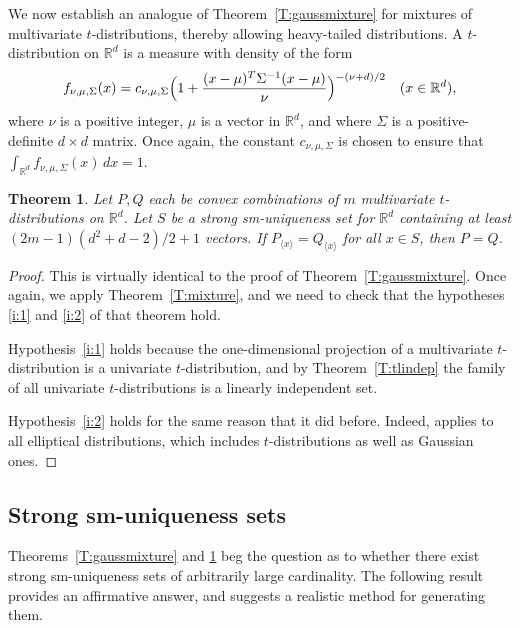 \documentclass[11pt]{amsart}
\theoremstyle{plain}
\newtheorem{theorem}{Theorem}[section]
\theoremstyle{remark}
\newcommand{\RR}{\mathbb{R}}
\begin{document}
We now establish an analogue of Theorem~\ref{T:gaussmixture}
for mixtures of  multivariate $t$-dist\-ributions,
thereby allowing heavy-tailed distributions. 
A $t$-distribution on $\RR^d$ is a measure with density of the form
\[
f_{\nu,\mu,\Sigma}(x)
=c_{\nu,\mu,\Sigma}\Bigl(1+\frac{(x-\mu)^T\Sigma^{-1}(x-\mu)}{\nu}\Bigr)^{-(\nu+d)/2}\quad(x\in\RR^d),
\]
where $\nu$ is a positive integer, $\mu$ is a vector in $\RR^d$, 
and where $\Sigma$ is a positive-definite $d\times d$ matrix.
Once again, the constant $c_{\nu,\mu,\Sigma}$ is chosen 
to ensure that $\int_{\RR^d}f_{\nu,\mu,\Sigma}(x)\,dx=1$.
	
\begin{theorem}\label{T:tmixture}
Let $P,Q$ each be convex combinations of  $m$
multivariate  $t$-dist\-ributions on $\RR^d$. 
Let $S$ be a strong sm-uniqueness set for $\RR^d$ containing at least $(2m-1)(d^2+d-2)/2+1$ vectors.
If $P_{\langle x\rangle}=Q_{\langle x\rangle}$ for all $x\in S$, then $P=Q$.
\end{theorem}
	
\begin{proof}
This is virtually identical to the proof of Theorem~\ref{T:gaussmixture}.
Once again, we apply Theorem~\ref{T:mixture},
and we need to check that the hypotheses \eqref{i:1}
and \eqref{i:2} of that theorem hold.
		
Hypothesis~\eqref{i:1} holds because the one-dimensional
projection of a multivariate $t$-distribution is a univariate
$t$-distribution, and by Theorem~\ref{T:tlindep}
the family of all univariate $t$-distributions is a linearly independent set.
		
Hypothesis~\eqref{i:2} holds for the same reason that it did before.
Indeed, \cite[Theorem~1]{FMR23a} applies to all elliptical distributions, 
which includes $t$-dist\-ributions as well as Gaussian ones.
\end{proof}
	
	
	
\subsection{Strong sm-uniqueness sets}\label{S:strongsmu}
	
Theorems~\ref{T:gaussmixture} and \ref{T:tmixture} beg the question 
as to whether there exist strong sm-uniqueness sets of arbitrarily large cardinality.
The following result provides an affirmative answer,
and  suggests a realistic method for generating them.
\end{document}

